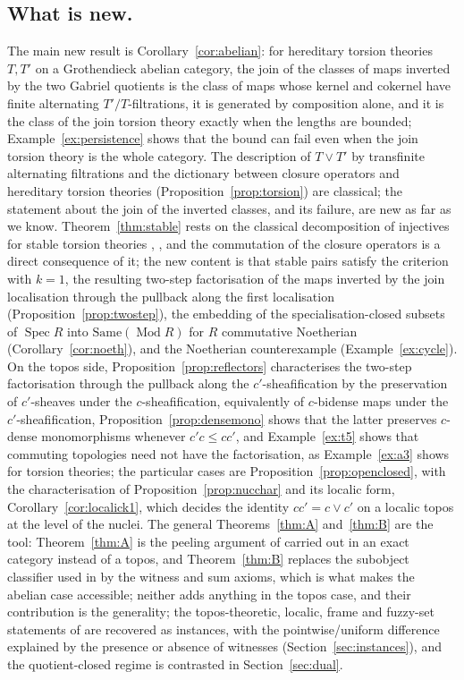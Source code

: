 \documentclass[11pt]{amsart}
\theoremstyle{definition}
\newcommand{\Same}{\mathrm{Same}}
\begin{document}
\subsection*{What is new.}
The main new result is Corollary~\ref{cor:abelian}: for hereditary torsion
theories $T,T'$ on a Grothendieck abelian category, the join of the classes
of maps inverted by the two Gabriel quotients is the class of maps whose
kernel and cokernel have finite alternating $T'/T$-filtrations, it is
generated by composition alone, and it is the class of the join torsion
theory exactly when the lengths are bounded; Example~\ref{ex:persistence}
shows that the bound can fail even when the join torsion theory is the
whole category. The description of $T\vee T'$ by transfinite alternating
filtrations and the dictionary between closure operators and hereditary
torsion theories (Proposition~\ref{prop:torsion}) are classical; the
statement about the join of the inverted classes, and its failure, are
new as far as we know. Theorem~\ref{thm:stable} rests on the classical
decomposition of injectives for stable torsion theories
\cite[Ch.~VI, \S7]{Stenstrom}, \cite{Golan76,Golan}, and the commutation of
the closure operators is a direct consequence of it; the new content is
that stable pairs satisfy the criterion with $k=1$, the resulting two-step
factorisation of the maps inverted by the join localisation through the
pullback along the first localisation (Proposition~\ref{prop:twostep}), the
embedding
of the specialisation-closed subsets of $\operatorname{Spec}R$ into
$\Same(\operatorname{Mod}R)$ for $R$ commutative Noetherian
(Corollary~\ref{cor:noeth}), and the Noetherian counterexample
(Example~\ref{ex:cycle}). On the topos side,
Proposition~\ref{prop:reflectors} characterises the two-step factorisation
through the pullback along the $c'$-sheafification by the preservation of
$c'$-sheaves under the $c$-sheafification, equivalently of $c$-bidense
maps under the $c'$-sheafification, Proposition~\ref{prop:densemono} shows
that the latter preserves $c$-dense monomorphisms whenever $c'c\le cc'$,
and Example~\ref{ex:t5} shows that commuting topologies need not have the
factorisation, as Example~\ref{ex:a3} shows for torsion theories; the
particular cases are
Proposition~\ref{prop:openclosed}, with the characterisation of
Proposition~\ref{prop:nucchar} and its localic form,
Corollary~\ref{cor:localick1}, which decides the identity $cc'=c\vee c'$
on a localic topos at the level of the nuclei. The general Theorems~\ref{thm:A} and~\ref{thm:B}
are the tool: Theorem~\ref{thm:A} is the peeling argument of
\cite[Thm.~A]{Stabjoin} carried out in an exact category instead of a
topos, and Theorem~\ref{thm:B} replaces the subobject classifier used in
\cite[Thm.~B]{Stabjoin} by the witness and sum axioms, which is what makes
the abelian case accessible; neither adds anything in the topos case, and
their contribution is the generality; the
topos-theoretic, localic, frame and fuzzy-set statements of
\cite{Stabjoin,Fuzzysame} are recovered as instances, with the
pointwise/uniform difference explained by the presence or absence of
witnesses (Section~\ref{sec:instances}), and the quotient-closed regime is
contrasted in Section~\ref{sec:dual}.
\end{document}
